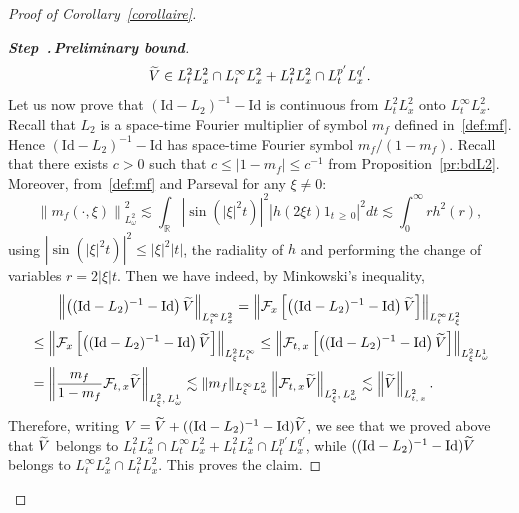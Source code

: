 \documentclass[AHL, Unicode, longabstracts,published]{cedram}
\newcommand{\R}{\mathbb{R}}
\newcommand{\Id}{\mathrm{Id}}
\newcommand{\mclF}{\mathcal{F}}
\newcounter{stepcount}
\newenvironment{step}[1]{\refstepcounter{stepcount}\begin{proof}[{\bf{Step~\thestepcount}{.\,\emph{#1}}}]}{\let\qed\relax\end{proof}}
\let\oldtilde\tilde
\renewcommand*{\tilde}[1]{\mathchoice{\widetilde{#1}}{\widetilde{#1}}{\oldtilde{#1}}{\oldtilde{#1}}}
\begin{document}
\begin{proof}[Proof of Corollary~\ref{corollaire}]
\begin{step}{{Preliminary bound}}
\[
\tilde V \in L^2_tL^2_x\cap L^{\infty}_tL^2_x+ L^2_tL^2_x\cap L^{p'}_tL^{q'}_x.
\]
Let us now prove that $(\Id-L_2)^{-1}-\Id$ is continuous from $L^2_tL^2_x$ onto $L^{\infty}_tL^{2}_x$. Recall that $L_2$ is a space-time Fourier multiplier of symbol $m_f$ defined in~\eqref{def:mf}. Hence $(\Id-L_2)^{-1}-\Id$ has space-time Fourier symbol $m_f/(1-m_f)$. Recall that there exists $c>0$ such that $c\leq |1-m_f|\leq c^{-1}$ from Proposition~\ref{pr:bdL2}. Moreover, from~\eqref{def:mf} and Parseval for any $\xi\neq 0$:
\[
\left\| m_f(\cdot,\xi)\right\|_{L^{2}_\omega}^2\lesssim \int_{\R} \left|\sin\left(|\xi|^2t\right)\right|^2 \left|h(2\xi t)1_{t\,\geq\,0}\right|^2dt \lesssim \int_0^\infty rh^2(r),
\]
using $|\sin(|\xi|^2t)|^2\leq |\xi|^2|t|$, the radiality of $h$ and performing the change of variables $r=2|\xi| t$. Then we have indeed, by Minkowski's inequality,
\begin{multline*}
\left\|\left((\Id-L_2)^{-1}-\Id\right)\tilde V\right\|_{L^\infty_t L^2_x}
=\left\|\mclF_x\left[\left((\Id-L_2)^{-1}-\Id\right)\tilde V\right]\right\|_{L^\infty_t L^2_\xi}\\
\begin{aligned}
&\leq \left\| \mclF_x\left[\left((\Id-L_2)^{-1}-\Id\right)\tilde V\right]\right\|_{L^2_\xi L^\infty_t}
\leq \left\| \mclF_{t,\,x}\left[\left((\Id-L_2)^{-1}-\Id\right)\tilde V\right]\right\|_{L^2_\xi L^1_\omega}\\
&= \left\|\frac{m_f}{1-m_f}\mclF_{t,\,x}\tilde V\right\|_{L^2_\xi,\,L^1_\omega}
\lesssim \| m_f\|_{L^{\infty}_\xi L^{2}_\omega}\left\| \mclF_{t,\,x}\tilde V\right\|_{L^2_\xi,\,L^2_\omega}\lesssim \left\| \tilde V \right\|_{L^2_{t,\,x}}.
\end{aligned}
\end{multline*}
Therefore, writing $V=\tilde V+((\Id-L_2)^{-1}-\Id)\tilde V$, we see that we proved above that $\tilde V$ belongs to $L^2_tL^2_x\cap L^{\infty}_tL^2_x+ L^2_tL^2_x\cap L^{p'}_tL^{q'}_x$, while $((\Id-L_2)^{-1}-\Id)\tilde V$ belongs to $L^{\infty}_tL^{2}_x\cap L^2_tL^2_x$. This proves the claim.
\end{step}


\end{proof}
\end{document}
